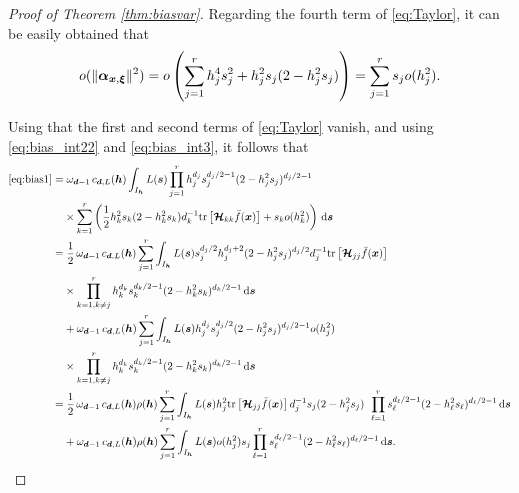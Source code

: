 \documentclass[oneside,11pt]{article}
\begin{document}
\begin{proof}[Proof of Theorem \ref{thm:biasvar}]
Regarding the fourth term of \eqref{eq:Taylor}, it can be easily obtained that
\begin{align}\label{eq:bias_int3}
	o(\|\boldsymbol\alpha_{\boldsymbol{x},\boldsymbol\xi}\|^2)=o\left(\sum_{j=1}^rh_j^4s_j^2+h_j^2s_j(2-h_j^2s_j)\right)=\sum_{j=1}^rs_jo(h_j^2).
\end{align}

Using that the first and second terms of \eqref{eq:Taylor} vanish, and using \eqref{eq:bias_int22} and \eqref{eq:bias_int3}, it follows that
\begin{align*}
    \eqref{eq:bias1}=&\;\omega_{\boldsymbol{d}-1}\, c_{\boldsymbol{d},L}({\boldsymbol{h}}) \int_{I_{\boldsymbol{h}}}L(\boldsymbol{s})\prod_{j=1}^r h_j^{d_j}s_j^{d_j/2-1} (2-h_j^2s_j)^{d_j/2-1}\,\nonumber\\
    &\times\sum_{k=1}^r\left(\frac{1}{2}h_k^2s_k(2-h_k^2s_k)d_k^{-1}\mathrm{tr}\left[\boldsymbol{\mathcal{H}}_{kk}\bar{f}(\boldsymbol{x})\right]+s_ko(h_k^2)\right)\,\mathrm{d} \boldsymbol{s}\\
    =&\;\frac{1}{2} \,\omega_{\boldsymbol{d}-1}\,  c_{\boldsymbol{d},L}({\boldsymbol{h}}) \sum_{j=1}^r\int_{I_{\boldsymbol{h}}}L(\boldsymbol{s})s_j^{d_j/2}h_j^{d_j+2} (2-h_j^2s_j)^{d_j/2}d_j^{-1}\mathrm{tr}\left[\boldsymbol{\mathcal{H}}_{jj}\bar{f}(\boldsymbol{x})\right]\,\nonumber\\
    &\times\prod_{k=1,k\neq j}^r h_k^{d_k}s_k^{d_k/2-1} (2-h_k^2s_k)^{d_k/2-1} \,\mathrm{d} \boldsymbol{s}\\
    &+\omega_{\boldsymbol{d}-1}\, c_{\boldsymbol{d},L}({\boldsymbol{h}}) \sum_{j=1}^r\int_{I_{\boldsymbol{h}}}L(\boldsymbol{s})h_j^{d_j}s_j^{d_j/2} (2-h_j^2s_j)^{d_j/2-1}o(h_j^2)\,\nonumber\\
    &\times\prod_{k=1,k\neq j}^r h_k^{d_k}s_k^{d_k/2-1} (2-h_k^2s_k)^{d_k/2-1} \,\mathrm{d} \boldsymbol{s}\\
    =&\;\frac{1}{2} \, \omega_{\boldsymbol{d}-1}\, c_{\boldsymbol{d},L}({\boldsymbol{h}}) \rho({\boldsymbol{h}})\sum_{j=1}^r\int_{I_{\boldsymbol{h}}}L(\boldsymbol{s})h_j^2\mathrm{tr}\left[\boldsymbol{\mathcal{H}}_{jj}\bar{f}(\boldsymbol{x})\right]d_j^{-1}s_j (2-h_j^2s_j)\,\;\prod_{\ell=1}^r s_\ell^{d_\ell/2-1} (2-h_\ell^2s_\ell)^{d_\ell/2-1} \,\mathrm{d} \boldsymbol{s}\\
    &+\omega_{\boldsymbol{d}-1}\,  c_{\boldsymbol{d},L}({\boldsymbol{h}}) \rho({\boldsymbol{h}})\sum_{j=1}^r\int_{I_{\boldsymbol{h}}}L(\boldsymbol{s})o(h_j^2)s_j\prod_{\ell=1}^r s_\ell^{d_\ell/2-1} (2-h_\ell^2s_\ell)^{d_\ell/2-1}  \,\mathrm{d} \boldsymbol{s}.
\end{align*}


\end{proof}
\end{document}
